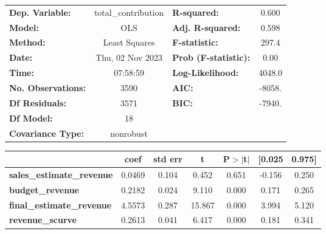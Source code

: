 \begin{center}
\begin{tabular}{lclc}
\toprule
\textbf{Dep. Variable:}                     & total\_contribution & \textbf{  R-squared:         } &     0.600   \\
\textbf{Model:}                             &         OLS         & \textbf{  Adj. R-squared:    } &     0.598   \\
\textbf{Method:}                            &    Least Squares    & \textbf{  F-statistic:       } &     297.4   \\
\textbf{Date:}                              &   Thu, 02 Nov 2023  & \textbf{  Prob (F-statistic):} &     0.00    \\
\textbf{Time:}                              &       07:58:59      & \textbf{  Log-Likelihood:    } &    4048.0   \\
\textbf{No. Observations:}                  &          3590       & \textbf{  AIC:               } &    -8058.   \\
\textbf{Df Residuals:}                      &          3571       & \textbf{  BIC:               } &    -7940.   \\
\textbf{Df Model:}                          &            18       & \textbf{                     } &             \\
\textbf{Covariance Type:}                   &      nonrobust      & \textbf{                     } &             \\
\bottomrule
\end{tabular}
\begin{tabular}{lcccccc}
                                            & \textbf{coef} & \textbf{std err} & \textbf{t} & \textbf{P$> |$t$|$} & \textbf{[0.025} & \textbf{0.975]}  \\
\midrule
\textbf{sales\_estimate\_revenue}           &       0.0469  &        0.104     &     0.452  &         0.651        &       -0.156    &        0.250     \\
\textbf{budget\_revenue}                    &       0.2182  &        0.024     &     9.110  &         0.000        &        0.171    &        0.265     \\
\textbf{final\_estimate\_revenue}           &       4.5573  &        0.287     &    15.867  &         0.000        &        3.994    &        5.120     \\
\textbf{revenue\_scurve}                    &       0.2613  &        0.041     &     6.417  &         0.000        &        0.181    &        0.341     \\

\end{tabular}
\end{center}
